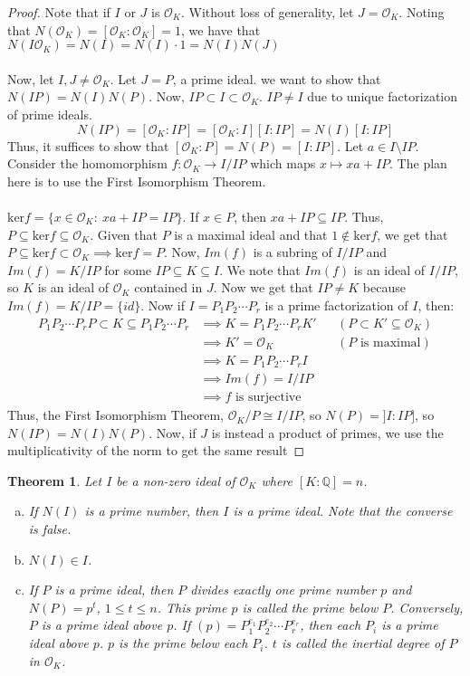 \documentclass{article}
\newcommand{\air}{\mathcal{O}_K}
\newcommand{\Q}{\mathbb{Q}}
\newtheorem{theorem}{Theorem}[subsection]
\begin{document}
\begin{proof}
Note that if $I$ or $J$ is $\air$. Without loss of generality, let $J=\air$. Noting that $N(\air)=[\air:\air]=1$, we have that $N(I\air)=N(I)=N(I)\cdot 1=N(I)N(J)$\\
\\
Now, let $I,J\neq\air$. Let $J=P$, a prime ideal. we want to show that $N(IP)=N(I)N(P)$. Now, $IP\subset I\subset \air$. $IP\neq I$ due to unique factorization of prime ideals.
$$N(IP)=[\air:IP]=[\air:I][I:IP]=N(I)[I:IP]$$
Thus, it suffices to show that $[\air : P] = N(P)=[I:IP]$. Let $a\in I\setminus IP$. Consider the homomorphism $f:\air\to I/IP$ which maps $x\mapsto xa + IP$. The plan here is to use the First Isomorphism Theorem.\\
\\
$\text{ker} f = \{x\in\air:\ xa + IP = IP\}$. If $x\in P$, then $xa+IP\subseteq IP$. Thus, $P\subseteq \text{ker} f\subseteq \air$. Given that $P$ is a maximal ideal and that $1\not\in \text{ker} f$, we get that $P\subseteq \text{ker} f\subset \air\implies \text{ker} f=P$. Now, $Im(f)$ is a subring of $I/IP$ and $Im(f)=K/IP$ for some $IP\subseteq K\subseteq I$. We note that $Im(f)$ is an ideal of $I/IP$, so $K$ is an ideal of $\air$ contained in $J$. Now we get that $IP\neq K$ because $Im(f)=K/IP=\{id\}$. Now if $I=P_1P_2\cdots P_r$ is a prime factorization of $I$, then:
\begin{align*}
    P_1P_2\cdots P_rP\subset K\subseteq P_1P_2\cdots P_r &\implies K=P_1P_2\cdots P_rK' &&(P\subset K'\subseteq\air)\\
    &\implies K'=\air &&(P \text{ is maximal})\\
    &\implies K=P_1P_2\cdots P_r I\\
    &\implies Im(f)=I/IP\\
    &\implies f\text{ is surjective}
\end{align*}
Thus,  the First Isomorphism Theorem, $\air/P\cong I/IP$, so $N(P)=]I:IP]$, so $N(IP)=N(I)N(P)$. Now, if $J$ is instead a product of primes, we use the multiplicativity of the norm to get the same result
\end{proof}
\newpage
\begin{theorem}
Let $I$ be a non-zero ideal of $\air$ where $[K:\Q]=n$.
\begin{enumerate}[a)]
    \item If $N(I)$ is a prime number, then $I$ is a prime ideal. Note that the converse is false.
    \item $N(I)\in I$.
    \item If $P$ is a prime ideal, then $P$ divides exactly one prime number $p$ and $N(P)=p^t$, $1\leq t\leq n$. This prime $p$ is called the prime below $P$. Conversely, $P$ is a prime ideal above $p$. If $(p)=P_1^{e_1}P_2^{e_2}\cdots P_r^{e_r}$, then each $P_i$ is a prime ideal above $p$. $p$ is the prime below each $P_i$. $t$ is called the inertial degree of $P$ in $\air$.
\end{enumerate}
\end{theorem}
\end{document}
